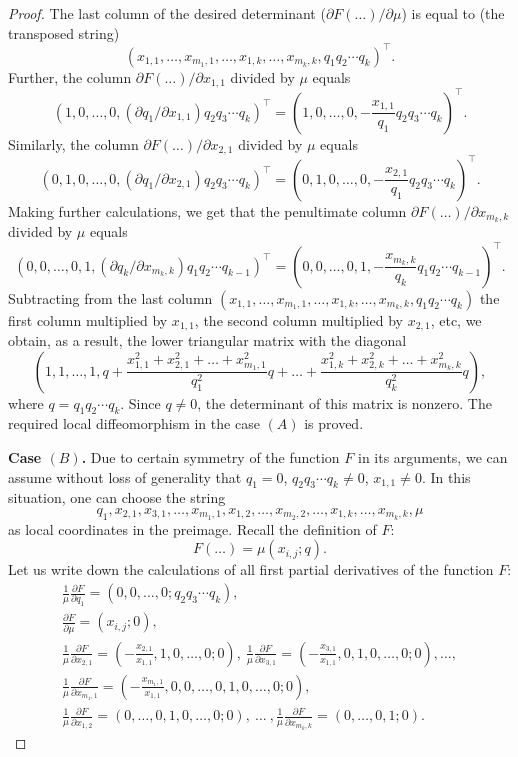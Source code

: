\documentclass[english, 12pt]{amsproc}
\numberwithin{equation}{section}
\theoremstyle{plain}
\theoremstyle{definition}
\theoremstyle{remark}
\newcommand{\dd}{\partial}
\begin{document}
\begin{proof}
The last column of the desired determinant ($\dd F(\ldots)/\dd \mu$) is equal to (the transposed string)
\[
(x_{1,1}, \ldots, x_{m_1,1}, \ldots, x_{1,k},\ldots, x_{m_k,k}, q_1q_2\cdots q_k)^\intercal.
\]
Further, the column $\dd F(\ldots)/\dd x_{1,1}$ divided by $\mu$ equals
\[
(1,0,\ldots,0, (\dd q_1/\dd x_{1,1}) q_2q_3\cdots q_k)^\intercal = \left(1,0,\ldots,0,  -\frac{x_{1,1}}{q_1} q_2q_3\cdots q_k \right)^\intercal.
\]
Similarly, the column $\dd F(\ldots)/\dd x_{2,1}$ divided by $\mu$ equals
\[
(0,1,0, \ldots,0, (\dd q_1/\dd x_{2,1}) q_2q_3\cdots q_k)^\intercal = \left(0,1,0,\ldots,0,  -\frac{x_{2,1}}{q_1} q_2q_3\cdots q_k \right)^\intercal.
\]
Making further calculations, we get that the penultimate column $\dd F(\ldots)/\dd x_{m_k,k}$ divided by $\mu$ equals
\[
(0,0, \ldots,0,1, (\dd q_k/\dd x_{m_k,k}) q_1q_2\cdots q_{k-1})^\intercal = \left(0,0,\ldots,0,1,-\frac{x_{m_k,k}}{q_k} q_1q_2\cdots q_{k-1}\right)^\intercal.
\]
Subtracting from the last column $(x_{1,1}, \ldots, x_{m_1,1}, \ldots, x_{1,k},\ldots, x_{m_k,k}, q_1q_2\cdots q_k)$ the first column multiplied by $x_{1,1}$, the second column multiplied by $x_{2,1}$, etc, we obtain, as a result, the lower triangular matrix with the diagonal
\[
\left(1,1,\ldots, 1, q + \frac{x_{1,1}^2 + x_{2,1}^2 + \ldots + x_{m_1,1}^2}{q_1^2}q +  \ldots + \frac{x_{1,k}^2 + x_{2,k}^2 + \ldots + x_{m_k,k}^2}{q_k^2}q\right),
\]
where $q=q_1q_2\cdots q_k$. Since $q\neq 0$, the determinant of this matrix is nonzero. The required local diffeomorphism in the case $(A)$ is proved.

\textbf{Case $(B)$.} Due to certain symmetry of the function $F$ in its arguments, we can assume without loss of generality that $q_1=0$, $q_2q_3\cdots q_k \neq 0$, $x_{1,1} \neq 0$. In this situation, one can choose the string
\[
q_1, x_{2,1}, x_{3,1}, \ldots, x_{m_1,1}, x_{1,2}, \ldots, x_{m_2,2}, \ldots, x_{1,k}, \ldots, x_{m_k,k}, \mu
\]
as local coordinates in the preimage. Recall the definition of $F$:
\[
F(\ldots) = \mu(x_{i,j}; q).
\]
Let us write down the calculations of all first partial derivatives of the function $F$:
\begin{gather*}
  \frac{1}{\mu}\frac{\dd F}{\dd q_1} = (0, 0, \ldots, 0; q_2q_3\cdots q_k), \\
  \frac{\dd F}{\dd \mu} = (x_{i,j};0), \\
  \frac{1}{\mu}\frac{\dd F}{\dd {x_{2,1}}} = \left(-\frac{x_{2,1}}{x_{1,1}}, 1, 0,\ldots, 0; 0\right), \  \frac{1}{\mu}\frac{\dd F}{\dd {x_{3,1}}} = \left(-\frac{x_{3,1}}{x_{1,1}}, 0, 1,0, \ldots, 0; 0\right),  \ldots , \\
  \frac{1}{\mu}\frac{\dd F}{\dd {x_{m_1,1}}} = \left(-\frac{x_{m_1,1}}{x_{1,1}}, 0, 0,\ldots, 0, 1, 0, \ldots, 0; 0\right), \\
  \frac{1}{\mu}\frac{\dd F}{\dd x_{1,2}} = (0, \ldots, 0,1,0, \ldots, 0; 0), \ \ldots \ ,   \frac{1}{\mu}\frac{\dd F}{\dd x_{m_k,k}} = (0, \ldots,0, 1;0).
\end{gather*}


\end{proof}
\end{document}
